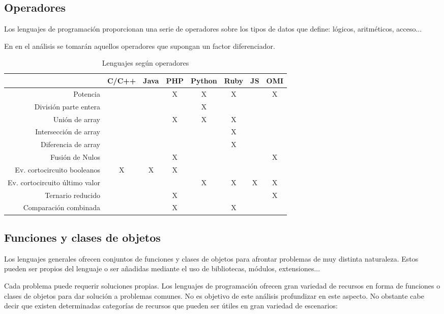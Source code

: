 \subsection{Operadores}
Los lenguajes de programación proporcionan una serie de operadores sobre los
tipos de datos que define: lógicos, aritméticos, acceso...

En en el análisis se tomarán aquellos operadores que supongan un factor 
diferenciador.

\FloatBarrier
\begin{table}[h]
\begin{center}
 
\begin{tabular}{|r|c|c|c|c|c|c|c|} \hline
 & C/C++ & Java & PHP  & Python & Ruby & JS & OMI\\ \hline
Potencia & & & X & X & X  &  & X \\ \hline
División parte entera & & &  & X &   &  &  \\ \hline
Unión de array & & & X & X & X  &  &  \\ \hline
Intersección de array & & &  &  & X  &  &  \\ \hline
Diferencia de array & & &  &  & X  &  &  \\ \hline
Fusión de Nulos  & & & X &  &   &  & X \\ \hline
Ev. cortocircuito booleanos & X & X & X &  &   &  &  \\ \hline
Ev. cortocircuito último valor & &  & & X & X  & X & X \\ \hline
Ternario reducido & &  & X &  &   &  & X \\ \hline
Comparación combinada & & & X &  & X  &  &  \\ \hline
\end{tabular}
\caption{Lenguajes según operadores}
\end{center}
\end{table}
\FloatBarrier



\subsection{Funciones y clases de objetos}
Los lenguajes generales ofrecen conjuntos de funciones y clases de objetos para afrontar problemas de muy distinta naturaleza. Estos pueden 
ser propios del lenguaje o ser añadidas mediante el uso de bibliotecas, módulos, extensiones... 

Cada problema puede requerir soluciones propias. Los lenguajes de programación ofrecen gran variedad de recursos en
forma de funciones o clases de objetos para dar solución a problemas comunes. No es objetivo de este análisis profundizar en este aspecto. 
No obstante cabe decir que existen determinadas categorías de recursos que pueden ser útiles en gran variedad de escenarios:

